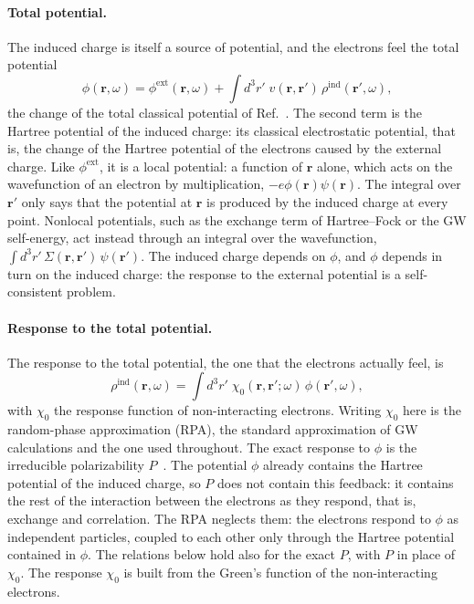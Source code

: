 \documentclass[10pt,a4paper]{paper}
\begin{document}
\paragraph{Total potential.} The induced charge is itself a source of potential, and the electrons feel the total
potential
\begin{equation}
\phi(\bm{r},\omega) = \phi^{\mathrm{ext}}(\bm{r},\omega) + \int d^3r'\;v(\bm{r},\bm{r}')\,\rho^{\mathrm{ind}}(\bm{r}',\omega) ,
\label{eq:phi_tot}
\end{equation}
the change of the total classical potential of Ref.~\cite{strinati1988application}. The second term is the Hartree
potential of the induced charge: its classical electrostatic potential, that is, the change of the Hartree potential
of the electrons caused by the external charge. Like $\phi^{\mathrm{ext}}$, it is a local potential: a function of
$\bm{r}$ alone, which acts on the wavefunction of an electron by multiplication, $-e\phi(\bm{r})\psi(\bm{r})$. The
integral over $\bm{r}'$ only says that the potential at $\bm{r}$ is produced by the induced charge at every point.
Nonlocal potentials, such as the exchange term of Hartree--Fock or the GW self-energy, act instead through an
integral over the wavefunction, $\int d^3r'\,\Sigma(\bm{r},\bm{r}')\,\psi(\bm{r}')$. The induced charge depends on
$\phi$, and $\phi$ depends in turn on the induced charge: the response to the external potential is a self-consistent
problem.

\paragraph{Response to the total potential.} The response to the total potential, the one that the electrons actually
feel, is
\begin{equation}
\rho^{\mathrm{ind}}(\bm{r},\omega) = \int d^3r'\;\chi_0(\bm{r},\bm{r}';\omega)\,\phi(\bm{r}',\omega) ,
\label{eq:chi0_def}
\end{equation}
with $\chi_0$ the response function of non-interacting electrons. Writing $\chi_0$ here is the random-phase
approximation (RPA), the standard approximation of GW calculations and the one used throughout. The exact response to
$\phi$ is the irreducible polarizability $P$~\cite{strinati1988application}. The potential $\phi$ already contains
the Hartree potential of the induced charge, so $P$ does not contain this feedback: it contains the rest of the
interaction between the electrons as they respond, that is, exchange and correlation. The RPA neglects them: the
electrons respond to $\phi$ as independent particles, coupled to each other only through the Hartree potential
contained in $\phi$. The relations below hold also for the exact $P$, with $P$ in place of $\chi_0$. The response
$\chi_0$ is built from the Green's function of the non-interacting electrons.
\end{document}
